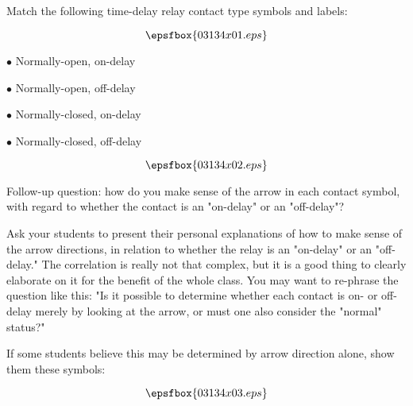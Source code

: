 

Match the following time-delay relay contact type symbols and labels:

$$\epsfbox{03134x01.eps}$$

\medskip
\item{$\bullet$} Normally-open, on-delay
\item{$\bullet$} Normally-open, off-delay
\item{$\bullet$} Normally-closed, on-delay
\item{$\bullet$} Normally-closed, off-delay
\medskip







$$\epsfbox{03134x02.eps}$$

\vskip 10pt

Follow-up question: how do you make sense of the arrow in each contact symbol, with regard to whether the contact is an "on-delay" or an "off-delay"?







Ask your students to present their personal explanations of how to make sense of the arrow directions, in relation to whether the relay is an "on-delay" or an "off-delay."  The correlation is really not that complex, but it is a good thing to clearly elaborate on it for the benefit of the whole class.  You may want to re-phrase the question like this: "Is it possible to determine whether each contact is on- or off-delay merely by looking at the arrow, or must one also consider the "normal" status?"

If some students believe this may be determined by arrow direction alone, show them these symbols:

$$\epsfbox{03134x03.eps}$$




